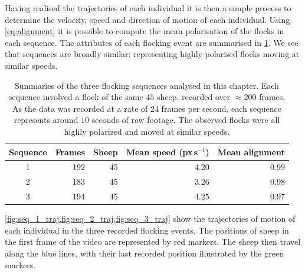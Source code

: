 Having realised the trajectories of each individual it is then a simple process
to determine the velocity, speed and direction of motion of each individual.
Using \cref{eq:alignment} it is possible to compute the mean polarisation of
the flocks in each sequence. The attributes of each flocking event are
summarised in \cref{tab:data_summary}. We see that sequences are broadly
similar: representing highly-polarised flocks moving at similar speeds.

\begin{table}[tbp]
\begin{tabular}{@{}crrrr@{}}
\toprule
Sequence & Frames & Sheep & Mean speed (px\,s$^{-1}$) & Mean alignment \\
\midrule
1 &    192 &     45 &      4.20 &          0.99 \\
2 &    183 &     45 &      3.26 &          0.98 \\
3 &    194 &     45 &      4.25 &          0.97 \\
\bottomrule
\end{tabular}
\caption{Summaries of the three flocking sequences analysed in this chapter.
  Each sequence involved a flock of the same $45$ sheep, recorded over
  $\approx200$ frames. As the data was recorded at a rate of $24$ frames per
  second, each sequence represents around $10$ seconds of raw footage. The
  observed flocks were all highly polarized and moved at similar speeds.}
\label{tab:data_summary}
\end{table}

\cref{fig:seq_1_traj,fig:seq_2_traj,fig:seq_3_traj} show the trajectories of
motion of each individual in the three recorded flocking events. The positions
of sheep in the first frame of the video are represented by red markers. The
sheep then travel along the blue lines, with their last recorded position
illustrated by the green markers.

